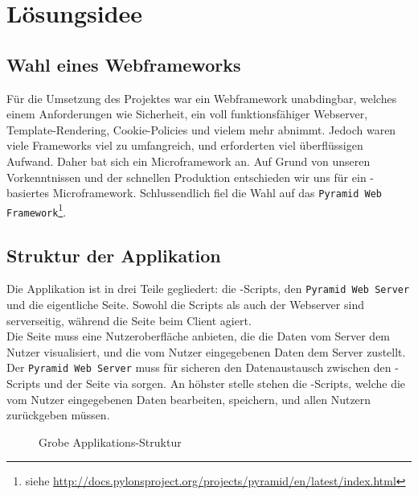 \chapter{Lösungsidee}
\section{Wahl eines Webframeworks}
Für die Umsetzung des Projektes war ein Webframework unabdingbar, welches einem Anforderungen wie Sicherheit,  %
ein voll funktionsfähiger Webserver, Template-Rendering, Cookie-Policies und vielem mehr abnimmt. Jedoch waren %
viele Frameworks viel zu umfangreich, und erforderten viel überflüssigen Aufwand. Daher bat sich ein Microframework
an. Auf Grund von unseren Vorkenntnissen und der schnellen Produktion entschieden wir uns für ein \Python-basiertes
Microframework.
Schlussendlich fiel die Wahl auf das \texttt{Pyramid Web Framework}\footnote{siehe \url{http://docs.pylonsproject.org/projects/pyramid/en/latest/index.html}}.

\section{Struktur der Applikation}
Die Applikation ist in drei Teile gegliedert: die \Python-Scripts, den \texttt{Pyramid Web Server} und die eigentliche Seite.
Sowohl die Scripts als auch der Webserver sind serverseitig, während die Seite beim Client agiert.\\
Die Seite muss eine Nutzeroberfläche anbieten, die die Daten vom Server dem Nutzer visualisiert, und die vom
Nutzer eingegebenen Daten dem Server zustellt. Der \texttt{Pyramid Web Server} muss für sicheren den Datenaustausch zwischen den 
\Python-Scripts und der Seite via sorgen. An höhster stelle stehen die \Python-Scripts, welche die vom Nutzer eingegebenen Daten
bearbeiten, speichern, und allen Nutzern zurückgeben müssen.
\vspace{2em}

\begin{figure}[H]
	\centering
	\caption{Grobe Applikations-Struktur}
\end{figure}

